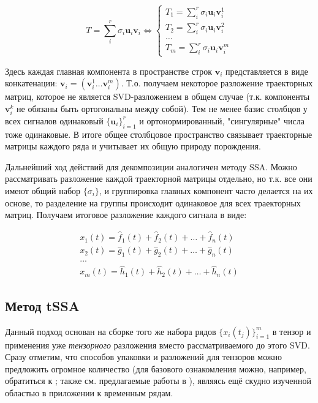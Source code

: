 			\begin{equation*}
				T = \sum\limits_i^{r} \sigma_i \mathbf{u}_i \mathbf{v}_i \Leftrightarrow \begin{cases}
					T_1 = \sum\limits_i^{r} \sigma_i \mathbf{u}_i \mathbf{v}_i^1 \\
					T_2 = \sum\limits_i^{r} \sigma_i \mathbf{u}_i \mathbf{v}_i^2 \\
					\ldots \\
					T_m = \sum\limits_i^{r} \sigma_i \mathbf{u}_i \mathbf{v}_i^m
				\end{cases}
			\end{equation*}
			
			Здесь каждая главная компонента в пространстве строк $ \mathbf{v}_i $ представляется в виде конкатенации: $ \mathbf{v}_i = (\mathbf{v}_i^1 \ldots \mathbf{v}_i^m) $. Т.о. получаем некоторое разложение траекторных матриц, которое не является SVD-разложением в общем случае (т.к. компоненты $ \mathbf{v}_i^k $ не обязаны быть ортогональны между собой). Тем не менее базис столбцов у всех сигналов одинаковый $ \{\mathbf{u}_i\}_{i=1}^r $ и ортонормированный, "сингулярные" числа тоже одинаковые. В итоге общее столбцовое пространство связывает траекторные матрицы каждого ряда и учитывает их общую природу порождения.
			
			Дальнейший ход действий для декомпозиции аналогичен методу SSA. Можно рассматривать разложение каждой траекторной матрицы отдельно, но т.к. все они имеют общий набор $ \{\sigma_i \} $, и группировка главных компонент часто делается на их основе, то разделение на группы происходит одинаковое для всех траекторных матриц. Получаем итоговое разложение каждого сигнала в виде:
			
			\begin{gather*}
				x_1(t) = \hat{f}_1(t) + \hat{f}_2(t) + \ldots + \hat{f}_{n}(t) \\
				x_2(t) = \hat{g}_1(t) + \hat{g}_2(t) + \ldots + \hat{g}_{n}(t) \\
				... \\
				x_m(t) = \hat{h}_1(t) + \hat{h}_2(t) + \ldots + \hat{h}_{n}(t)
			\end{gather*}
			
			\subsection*{Метод tSSA}\label{tSSA_sec}
			
			Данный подход основан на сборке того же набора рядов $ \{x_i(t_j)\}_{i = 1}^{m} $ в тензор и применения уже \textit{тензорного} разложения вместо рассматриваемого до этого SVD. Сразу отметим, что способов упаковки и разложений для тензоров можно предложить огромное количество (для базового ознакомления можно, например, обратиться к \cite{rabanser2017introduction}; также см. предлагаемые работы в ), являясь ещё скудно изученной областью в приложении к временным рядам.
			
